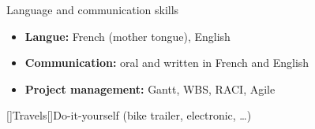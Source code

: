 \documentclass[11pt,a4paper,sans]{moderncv}        %
\newcommand{\myitem}{\textbullet}
\begin{document}
\begin{samepage}
{}%
{Language and communication skills}%
{{%
	\begin{itemize}[label=\myitem]%
	\item \textbf{Langue: } {\small French (mother tongue),  English}%
	\item \textbf{Communication: } {\small oral and written in French and English} %
	\item \textbf{Project management: } {\small Gantt, WBS, RACI, Agile}%
	\end{itemize}%
}}%
\vspace*{-4mm}%
[\bcfleur]{Travels}[\bcvelo]{Do-it-yourself (bike trailer, electronic, …)}%
\end{samepage}%
\end{document}
